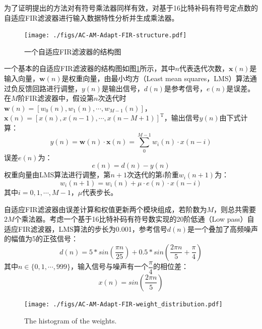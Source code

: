为了证明提出的方法对有符号乘法器同样有效，对基于16比特补码有符号定点数的自适应FIR滤波器进行输入数据特性分析并生成乘法器。
\begin{figure}[!ht]
    \centering
    \texttt{[image: ./figs/AC-AM-Adapt-FIR-structure.pdf]}
    \caption{一个自适应FIR滤波器的结构图}
    \label{AC:AM:Adapt:FIR:Fig:structure}
\end{figure}
一个基本的自适应FIR滤波器的结构图如图\ref{AC:AM:Adapt:FIR:Fig:structure}所示，其中$n$代表迭代次数，$\boldsymbol{x}(n)$是输入向量，$\boldsymbol{w}(n)$是权重向量，由最小均方（Least mean squares，LMS）算法通过负反馈回路进行调整，$y(n)$是输出信号，$d(n)$是参考信号，$e(n)$是误差。
在$M$阶FIR滤波器中，假设第$n$次迭代时$\boldsymbol{w}(n) = [w_0(n), w_1(n), \cdots , w_{M-1}(n)]$，$\boldsymbol{x}(n) = [x(n), x(n-1), \cdots , x(n-M+1)]^\mathrm{T}$，输出信号$y(n)$由下式计算：
\begin{equation}
    \label{AC:AM:Adapt:FIR:Eq:yn}
    y(n) = \boldsymbol{w}(n) \cdot \boldsymbol{x}(n) = \sum_{0}^{M-1} w_i(n) \cdot x(n-i)
\end{equation}
误差$e(n)$为：
\begin{equation}
    \label{AC:AM:Adapt:FIR:Eq:en}
    e(n) = d(n) - y(n)
\end{equation}
权重向量由LMS算法进行调整，第$n+1$次迭代的第$i$阶重$w_i (n+1)$为：
\begin{equation}
    \label{AC:AM:Adapt:FIR:Eq:LMS}
    w_i(n+1) = w_i(n) + \mu \cdot e(n) \cdot x(n-i)
\end{equation}
其中$i=0, 1, \cdots , M-1$，$\mu$代表步长。

自适应FIR滤波器由误差计算和权值更新两个模块组成，若阶数为$M$，则总共需要$2M$个乘法器。考虑一个基于16比特补码有符号数实现的20阶低通（Low pass）自适应FIR滤波器，LMS算法的步长为0.001，参考信号$d(n)$是一个叠加了高频噪声的幅值为5的正弦信号：
\begin{equation}
    \label{AC:AM:Adapt:FIR:Eq:dn}
    d(n) = 5 * sin ( \frac{\pi n}{25} ) + 0.5 * sin ( \frac{2 \pi n}{5}  + \frac{\pi}{4} )
\end{equation}
其中$n \in \{0, 1, \cdots, 999\}$，输入信号与噪声有一个$\dfrac{\pi}{4}$的相位差：
\begin{equation}
    \label{AC:AM:Adapt:FIR:Eq:xn}
    x(n) = sin ( \frac{2 \pi n}{5} )
\end{equation}

\begin{figure}[!ht]
    \centering
    \texttt{[image: ./figs/AC-AM-Adapt-FIR-weight\_distribution.pdf]}
    \caption{The histogram of the weights.}
    \label{AC:AM:Adapt:FIR:Fig:weight_distribution}
\end{figure}

